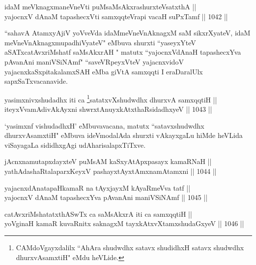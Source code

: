 
\begin{shl}
idaM meV\s knagxmaneVneVti puMsaMsAkxrashurxteVsatxthA || \\
yajocnxV dAnaM tapashecxVti samxqqteVrapi vacaH suPxTamf \hfill || 1042 || 
\end{shl}

\begin{artha}
``sahavA AtamxyAjiV yoVveVda idaMmeV\s neVnAknagxM saM sikxrXyateV, idaM meV\s neVnAknagxmupadhiVyateV" eMbuva shurxti ``yaseyxYteV aSATxcatAvxriMshatf saMsAkxrAH " matutx ``yajocnxVdAnaH tapashecxYva pAvanAni maniVSiNAmf" ``saveVRpeyxVteV yajacnxvidoV yajacnxkaSxpitakalamxSAH eMba giVtA samxqqti I eraDaralUlx sapxSaTxvacanavide.
\end{artha}



\begin{shl}
yasimxnivxshudadhx iti ca \footnote{CAMdoVgayxdalilx ``AhAra shudwdhx satavx shudidhxH satavx shudwdhx dhurxvAsamxtiH" eMdu heVLide.}satatxvXshudwdhx dhurxvA samxqqtiH || \\
iteyxVvamAdivAkAyxni shwrxtAnuyxkAtxthaRsidadhxyeV \hfill || 1043 ||  
\end{shl}

\begin{artha}
`yasimxnf vishudadhxH' eMbuvavacana, matutx ``satavxshudwdhx dhurxvAsamxtiH" eMbuva ideVmodalAda shurxti vAkayxgaLu hiMde heVLida viSayagaLa sididhxgAgi udAharisalapxTiTxve.
\end{artha}


\begin{shl}
jAcnxnamutapxdayxteV puMsAM kaSxyAtApxpasayx kamaRNaH || \\
yathA\s \s dashaRtalaparxKeyxV pashayxtAyxtAmxnamAtamxni \hfill || 1044 ||  
\end{shl}

\begin{shl}
yajacnxdAnatapaHkamaR na tAyxjayxM kAyaRmeVva tatf || \\
yajocnxV dAnaM tapashecxYva pAvanAni maniVSiNAmf \hfill || 1045 ||  
\end{shl}
				
\begin{shl}
catAvxriMshatatxthA\s SwTx ca saMsAkxrA iti ca samxqqtiH || \\
yoVginaH kamaR kuvaRnitx saknagxM tayxkAtxvX\s \s tamxshudaGxyeV \hfill || 1046 ||  
\end{shl}
				
